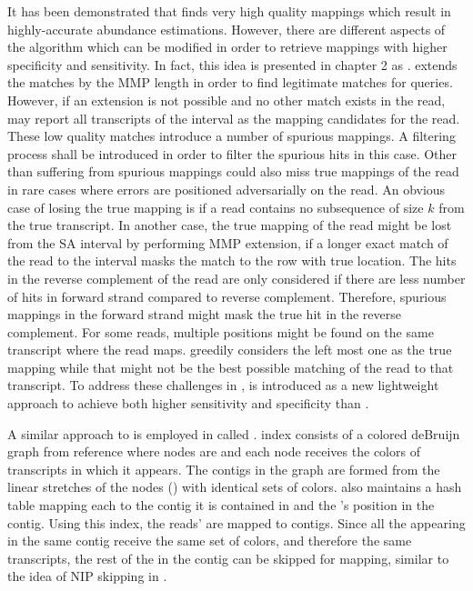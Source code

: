 It has been demonstrated that \qm finds very high quality mappings which result 
in highly-accurate abundance estimations. However, there are different aspects of 
the algorithm which can be modified in order to retrieve mappings with higher 
specificity and sensitivity. In fact, this idea is presented in chapter 2 as 
\sla. \Qm extends the \kmer matches by the MMP length in order to find legitimate 
matches for queries. However, if an extension is not possible and no other \kmer 
match exists in the read, \qm may report all transcripts of the interval as the 
mapping candidates for the read. These low quality matches introduce a number 
of spurious mappings. A filtering process shall be introduced in order to filter 
the spurious hits in this case. Other than suffering from spurious mappings \qm 
could also miss true mappings of the read in rare cases where errors are 
positioned adversarially on the read. An obvious case of losing the true mapping 
is if a read contains no subsequence of size $k$ from the true transcript. In 
another case, the true mapping of the read might be lost from the SA interval 
by performing MMP extension, if a longer exact match of the read to the interval 
masks the match to the row with true location. The hits in the reverse complement 
of the read are only considered if there are less number of hits in forward strand 
compared to reverse complement. Therefore, spurious mappings in the forward strand 
might mask the true hit in the reverse complement. For some reads, multiple 
positions might be found on the same transcript where the read maps. \Qm 
greedily considers the left most one as the true mapping while that might 
not be the best possible matching of the read to that transcript. To address 
these challenges in \qm, \sla is introduced as a new lightweight approach to 
achieve both higher sensitivity and specificity than \qm.

A similar approach to \qm is employed in \kallisto \citep{Bray2016Kallisto} 
called \pa. \kallisto index consists of a colored deBruijn graph from reference 
where nodes are \kmers and each node receives the colors of transcripts in which 
it appears. The contigs in the graph are formed from the linear stretches of the 
nodes (\kmers) with identical sets of colors. \Kallisto also maintains a hash 
table mapping each \kmer to the contig it is contained in and the \kmer's position 
in the contig. Using this index, the reads' \kmers are mapped to contigs. Since 
all the \kmers appearing in the same contig receive the same set of colors, and 
therefore the same transcripts, the rest of the \kmers in the contig can be 
skipped for mapping, similar to the idea of NIP skipping in \qm.

